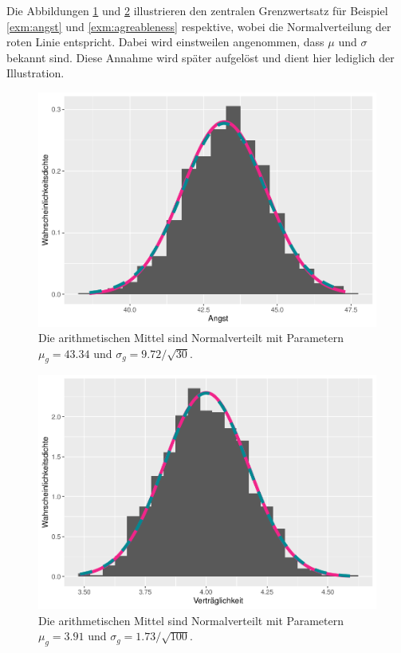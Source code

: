 \documentclass[
]{book}
\theoremstyle{definition}
\theoremstyle{definition}
\theoremstyle{definition}
\theoremstyle{definition}
\theoremstyle{remark}
\begin{document}
Die Abbildungen \ref{fig:exm-angst-normal-approx} und \ref{fig:exm-agreableness-normal-approx} illustrieren den zentralen Grenzwertsatz für Beispiel \ref{exm:angst} und \ref{exm:agreableness} respektive, wobei die Normalverteilung der roten Linie entspricht. Dabei wird einstweilen angenommen, dass \(\mu\) und \(\sigma\) bekannt sind. Diese Annahme wird später aufgelöst und dient hier lediglich der Illustration.

\begin{figure}

{\centering \includegraphics{aps_statistik1_files/figure-latex/exm-angst-normal-approx-1} 

}

\caption{Die arithmetischen Mittel sind Normalverteilt mit Parametern $\mu_g = 43.34$ und $\sigma_g = 9.72 / \sqrt{30}$.}\label{fig:exm-angst-normal-approx}
\end{figure}

\begin{figure}

{\centering \includegraphics{aps_statistik1_files/figure-latex/exm-agreableness-normal-approx-1} 

}

\caption{Die arithmetischen Mittel sind Normalverteilt mit Parametern $\mu_g = 3.91$ und $\sigma_g = 1.73 / \sqrt{100}$.}\label{fig:exm-agreableness-normal-approx}
\end{figure}
\end{document}
